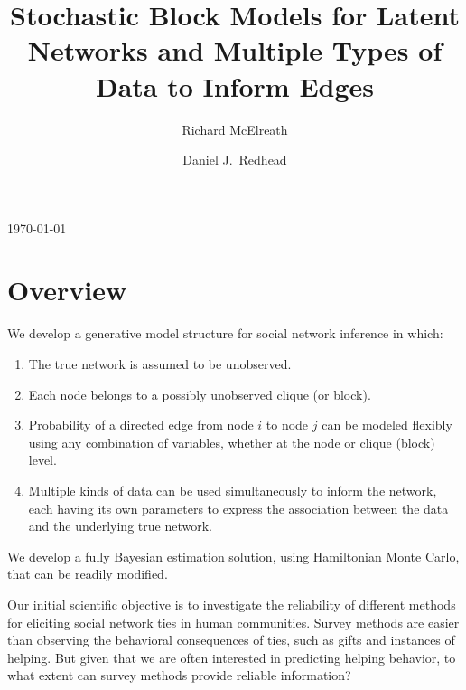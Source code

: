 \documentclass[reqno,12pt,a4paper]{amsart}
\begin{document}
\title[SBMs with Multiple Types of Data]{Stochastic Block Models for Latent Networks and Multiple Types of Data to Inform Edges}
\author{Richard McElreath \and Daniel J.~Redhead}
\address{Department of Human Behavior, Ecology and Culture, Max Planck Institute for Evolutionary Anthropology, Leipzig, Germany}


\maketitle

{\vspace{-6pt}\footnotesize\begin{center}\today\end{center}\vspace{12pt}}

\linenumbers
\modulolinenumbers[3]



\section{Overview}

We develop a generative model structure for social network inference in which:
\begin{enumerate}
\item The true network is assumed to be unobserved.
\item Each node belongs to a possibly unobserved clique (or block).
\item Probability of a directed edge from node $i$ to node $j$ can be modeled flexibly using any combination of variables, whether at the node or clique (block) level.
\item Multiple kinds of data can be used simultaneously to inform the network, each having its own parameters to express the association between the data and the underlying true network.
\end{enumerate}
We develop a fully Bayesian estimation solution, using Hamiltonian Monte Carlo, that can be readily modified.

Our initial scientific objective is to investigate the reliability of different methods for eliciting social network ties in human communities. Survey methods are easier than observing the behavioral consequences of ties, such as gifts and instances of helping. But given that we are often interested in predicting helping behavior, to what extent can survey methods provide reliable information?
\end{document}
